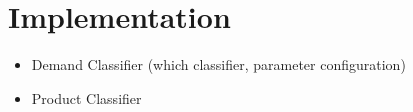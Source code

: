 
\section{Implementation}
\label{sec:implementation}

\begin{itemize}
	\item Demand Classifier (which classifier, parameter configuration)
	\item Product Classifier
\end{itemize}

